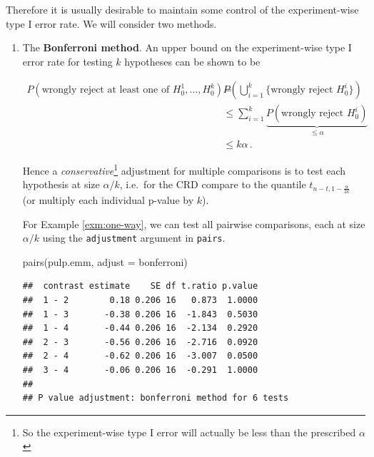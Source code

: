 \documentclass[
]{book}
\newenvironment{Shaded}{\begin{snugshade}}{\end{snugshade}}
\newcommand{\AttributeTok}[1]{\textcolor[rgb]{0.77,0.63,0.00}{#1}}
\newcommand{\FunctionTok}[1]{\textcolor[rgb]{0.00,0.00,0.00}{#1}}
\newcommand{\NormalTok}[1]{#1}
\newcommand{\StringTok}[1]{\textcolor[rgb]{0.31,0.60,0.02}{#1}}
\theoremstyle{definition}
\theoremstyle{definition}
\theoremstyle{definition}
\theoremstyle{definition}
\theoremstyle{remark}
\begin{document}
Therefore it is usually desirable to maintain some control of the experiment-wise type I error rate. We will consider two methods.

\begin{enumerate}
\def\labelenumi{\arabic{enumi}.}
\item
  The \textbf{Bonferroni method}. An upper bound on the experiment-wise type I error rate for testing \(k\) hypotheses can be shown to be

  \begin{align*}
  P(\mbox{wrongly reject at least one of } H_{0}^1, \ldots, H_{0}^k) = &    P\left(\bigcup_{i=1}^{k}\{\mbox{wrongly reject } H_{0}^i\}\right) \\
  & \leq \sum_{i=1}^{k}\underbrace{P(\mbox{wrongly reject } H_{0}^i)}_{\leq \alpha} \\ 
  & \leq k\alpha\,.
  \end{align*}

  Hence a \emph{conservative}\footnote{So the experiment-wise type I error will actually be less than the prescribed \(\alpha\)} adjustment for multiple comparisons is to test each hypothesis at size \(\alpha / k\), i.e.~for the CRD compare to the quantile \(t_{n-t, 1-\frac{\alpha}{2k}}\) (or multiply each individual p-value by \(k\)).

  For Example \ref{exm:one-way}, we can test all pairwise comparisons, each at size \(\alpha/k\) using the \texttt{adjustment} argument in \texttt{pairs}.

\begin{Shaded}
\begin{Highlighting}[]
\FunctionTok{pairs}\NormalTok{(pulp.emm, }\AttributeTok{adjust =} \StringTok{\textquotesingle{}bonferroni\textquotesingle{}}\NormalTok{)}
\end{Highlighting}
\end{Shaded}

\begin{verbatim}
##  contrast estimate    SE df t.ratio p.value
##  1 - 2        0.18 0.206 16   0.873  1.0000
##  1 - 3       -0.38 0.206 16  -1.843  0.5030
##  1 - 4       -0.44 0.206 16  -2.134  0.2920
##  2 - 3       -0.56 0.206 16  -2.716  0.0920
##  2 - 4       -0.62 0.206 16  -3.007  0.0500
##  3 - 4       -0.06 0.206 16  -0.291  1.0000
## 
## P value adjustment: bonferroni method for 6 tests
\end{verbatim}


\end{enumerate}
\end{document}
